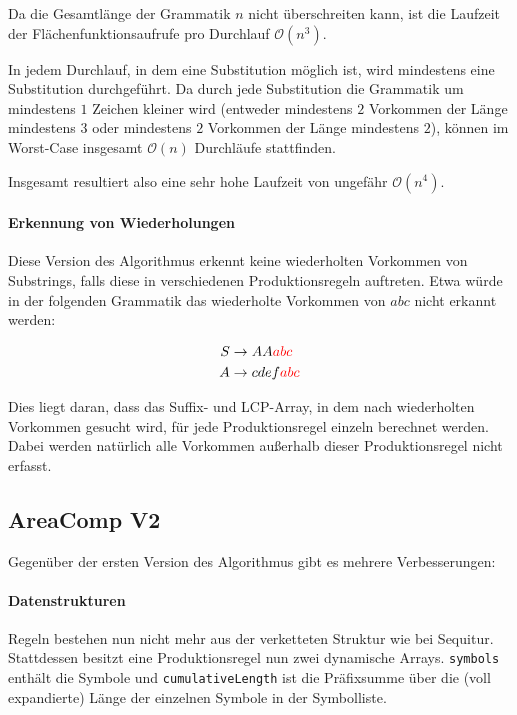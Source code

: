 Da die Gesamtlänge der Grammatik $n$ nicht überschreiten kann, ist die Laufzeit der Flächenfunktionsaufrufe pro Durchlauf $\mathcal{O}(n^3)$. 

In jedem Durchlauf, in dem eine Substitution möglich ist, wird mindestens eine Substitution durchgeführt. Da durch jede Substitution die Grammatik um mindestens $1$ Zeichen kleiner wird (entweder mindestens $2$ Vorkommen der Länge mindestens $3$ oder mindestens $2$ Vorkommen der Länge mindestens $2$), können im Worst-Case insgesamt $\mathcal{O}(n)$ Durchläufe stattfinden.

Insgesamt resultiert also eine sehr hohe Laufzeit von ungefähr $\mathcal{O}(n^4)$.

\paragraph{Erkennung von Wiederholungen}
Diese Version des Algorithmus erkennt keine wiederholten Vorkommen von Substrings, falls diese in verschiedenen Produktionsregeln auftreten.
Etwa würde in der folgenden Grammatik das wiederholte Vorkommen von $abc$ nicht erkannt werden:

\begin{align*}
	S &\rightarrow AA\textcolor{red}{abc}\\
	A &\rightarrow cdef\textcolor{red}{abc}
\end{align*}

Dies liegt daran, dass das Suffix- und LCP-Array, in dem nach wiederholten Vorkommen gesucht wird, für jede Produktionsregel einzeln berechnet werden. Dabei werden natürlich alle Vorkommen außerhalb dieser Produktionsregel nicht erfasst.

\subsection{AreaComp V2}

Gegenüber der ersten Version des Algorithmus gibt es mehrere Verbesserungen:

\paragraph{Datenstrukturen} Regeln bestehen nun nicht mehr aus der verketteten Struktur wie bei Sequitur. Stattdessen besitzt eine Produktionsregel nun zwei dynamische Arrays. \texttt{symbols} enthält die Symbole und \texttt{cumulativeLength} ist die Präfixsumme über die (voll expandierte) Länge der einzelnen Symbole in der Symbolliste.

